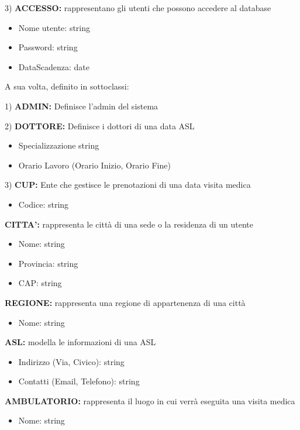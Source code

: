 \documentclass{report}
\begin{document}
3) \textbf{ACCESSO:} 
rappresentano gli utenti che possono accedere al database
\begin{itemize}
\item Nome utente: string
\item Password: string
\item DataScadenza: date
\end{itemize}

A sua volta, definito in sottoclassi:

1) \textbf{ADMIN:}
Definisce l’admin del sistema

2) \textbf{DOTTORE:}
 Definisce i dottori di una data ASL
\begin{itemize}
\item Specializzazione string
\item Orario Lavoro (Orario Inizio, Orario Fine)
\end{itemize}

3) \textbf{CUP:} 
Ente che gestisce le prenotazioni di una data visita medica
\begin{itemize}
\item Codice: string
\end{itemize}

\textbf{CITTA’:} 
rappresenta le città di una sede o la residenza di un utente
\begin{itemize}
\item Nome: string
\item Provincia: string
\item CAP: string
\end{itemize}

\textbf{REGIONE:} 
rappresenta una regione di appartenenza di una città
\begin{itemize}
\item Nome: string
\end{itemize}

\textbf{ASL:} 
modella le informazioni di una ASL
\begin{itemize}
\item Indirizzo (Via, Civico): string
\item Contatti (Email, Telefono): string
\end{itemize}


\textbf{AMBULATORIO:} 
rappresenta il luogo in cui verrà eseguita una visita medica
\begin{itemize}
\item Nome: string
\end{itemize}
\end{document}
